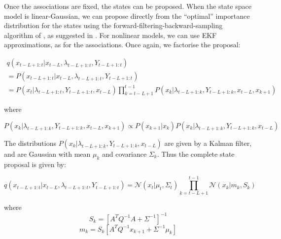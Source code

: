 Once the associations are fixed, the states can be proposed. When the state space model is linear-Gaussian, we can propose directly from the ``optimal'' importance distribution for the states using the forward-filtering-backward-sampling algorithm of \cite{Chib1996}, as suggested in \cite{Doucet2006}. For nonlinear models, we can use EKF approximations, as for the associations. Once again, we factorise the proposal:

\begin{multline}
q(x_{t-L+1:t}|x_{t-L}, \lambda_{t-L+1:t}, Y_{t-L+1:t}) \\
= P(x_{t-L+1:t}|x_{t-L}, \lambda_{t-L+1:t}, Y_{t-L+1:t}) \\
= P(x_t|\lambda_{t-L+1:t}, Y_{t-L+1:t}, x_{t-L}) \prod_{k=t-L+1}^{t-1} P(x_k|\lambda_{t-L+1:k}, Y_{t-L+1:k}, x_{t-L}, x_{k+1})
\label{eq:}
\end{multline}

where

\begin{equation}
P(x_k|\lambda_{t-L+1:k}, Y_{t-L+1:k}, x_{t-L}, x_{k+1}) \propto P(x_{k+1}|x_k) P(x_k|\lambda_{t-L+1:k}, Y_{t-L+1:k}, x_{t-L})
\label{eq:}
\end{equation}

The distributions $P(x_k|\lambda_{t-L+1:k}, Y_{t-L+1:k}, x_{t-L})$ are given by a Kalman filter, and are Gaussian with mean $\mu_k$ and covariance $\Sigma_k$. Thus the complete state proposal is given by:

\begin{equation}
q(x_{t-L+1:t}|x_{t-L}, \lambda_{t-L+1:t}, Y_{t-L+1:t}) = \mathcal{N}(x_t|\mu_t, \Sigma_t) \prod_{k=t-L+1}^{t-1} \mathcal{N}(x_k|m_k, S_k)
\label{eq:}
\end{equation}

where
\begin{equation}S_k = [ A^T Q^{-1} A + \Sigma^{-1} ]^{-1}\label{eq:}\end{equation}
\begin{equation}m_k = S_k [ A^T Q^{-1} x_{k+1} + \Sigma^{-1} \mu_k ]\label{eq:}\end{equation}